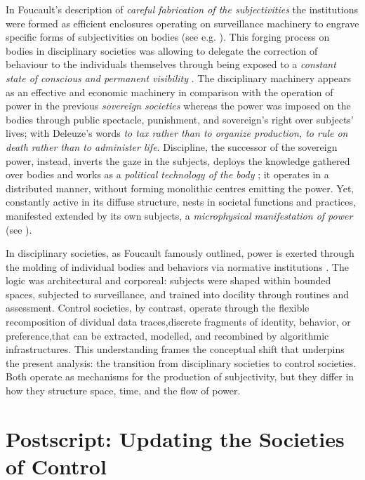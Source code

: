 \greensquare
In Foucault's description of \textit{careful fabrication of the subjectivities} \parencite[215]{foucault1995} the institutions were formed as efficient enclosures operating on surveillance machinery to engrave specific forms of subjectivities on bodies (see e.g. \cite[783]{foucault1982}). This forging process on bodies in disciplinary societies was allowing to delegate the correction of behaviour to the individuals themselves through being exposed to a \textit{constant state of conscious and permanent visibility} \parencite[202-203]{foucault1995}. The disciplinary machinery appears as an effective and economic machinery in comparison with the operation of power in the previous \textit{sovereign societies} whereas the power was imposed on the bodies through public spectacle, punishment, and sovereign's right over subjects' lives; with Deleuze's words \textit{to tax rather than to organize production, to rule on death rather than to administer life}\parencite*[3]{deleuze1992a}. Discipline, the successor of the sovereign power, instead, inverts the gaze in the subjects, deploys the knowledge gathered over bodies and works as a \textit{political technology of the body} \parencite[26]{foucault1995}; it operates in a distributed manner, without forming monolithic centres emitting the power. Yet, constantly active in its diffuse structure, nests in societal functions and practices, manifested extended by its own subjects, a \textit{microphysical manifestation of power} (see \cite[26-27]{foucault1995}).


\yellowsquare
In disciplinary societies, as Foucault famously outlined, power is exerted through the molding of individual bodies and behaviors via normative institutions \parencite{foucault2008}. The logic was architectural and corporeal: subjects were shaped within bounded spaces, subjected to surveillance, and trained into docility through routines and assessment. Control societies, by contrast, operate through the flexible recomposition of dividual data traces,discrete fragments of identity, behavior, or preference,that can be extracted, modelled, and recombined by algorithmic infrastructures. This understanding frames the conceptual shift that underpins the present analysis: the transition from disciplinary societies to control societies. Both operate as mechanisms for the production of subjectivity, but they differ in how they structure space, time, and the flow of power.


\section{Postscript: Updating the Societies of Control}

